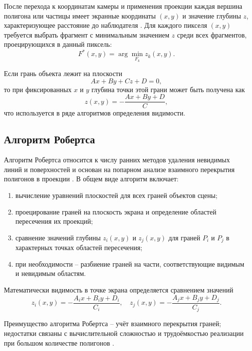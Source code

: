 После перехода к координатам камеры и применения проекции каждая вершина полигона или частицы имеет экранные координаты $(x, y)$ и значение глубины $z$, характеризующее расстояние до наблюдателя \cite{RogersAdams}. Для каждого пикселя $(x, y)$ требуется выбрать фрагмент с минимальным значением $z$ среди всех фрагментов, проецирующихся в данный пиксель:
\begin{equation}
	F^{\ast}(x, y) = \arg\min_{F_{k}} z_{k}(x, y).
\end{equation}

Если грань объекта лежит на плоскости
\begin{equation}
	A x + B y + C z + D = 0,
\end{equation}
то при фиксированных $x$ и $y$ глубина точки этой грани может быть получена как
\begin{equation}
	z(x, y) = -\frac{A x + B y + D}{C},
\end{equation}
что используется в ряде алгоритмов определения видимости.\cite{RogersAdams}

\subsection{Алгоритм Робертса}

Алгоритм Робертса относится к числу ранних методов удаления невидимых линий и поверхностей и основан на попарном анализе взаимного перекрытия полигонов в проекции \cite{RogersAdams}. В общем виде алгоритм включает:
\begin{enumerate}
	\item вычисление уравнений плоскостей для всех граней объектов сцены;
	\item проецирование граней на плоскость экрана и определение областей пересечения их проекций;
	\item сравнение значений глубины $z_{i}(x, y)$ и $z_{j}(x, y)$ для граней $P_{i}$ и $P_{j}$ в характерных точках областей пересечения;
	\item при необходимости -- разбиение граней на части, соответствующие видимым и невидимым областям.
\end{enumerate}

Математически видимость в точке экрана определяется сравнением значений
\begin{equation}
	z_{i}(x, y) = -\frac{A_{i} x + B_{i} y + D_{i}}{C_{i}}, \quad
	z_{j}(x, y) = -\frac{A_{j} x + B_{j} y + D_{j}}{C_{j}}.
\end{equation}

Преимущество алгоритма Робертса -- учёт взаимного перекрытия граней; недостатки связаны с вычислительной сложностью и трудоёмкостью реализации при большом количестве полигонов \cite{RogersAdams}.


